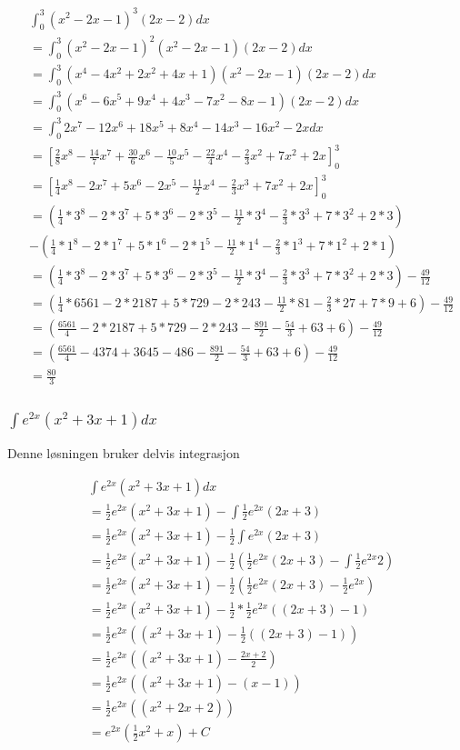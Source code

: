 \documentclass{article}
\begin{document}
\begin{align*}
    & \int_{0}^{3} (x^2-2x-1)^3(2x-2) dx \\
    &= \int_{0}^{3} (x^2-2x-1)^2(x^2-2x-1)(2x-2) dx \\
    &= \int_{0}^{3} (x^4-4x^2+2x^2+4x+1)(x^2-2x-1)(2x-2) dx \\
    &= \int_{0}^{3} (x^6-6x^5+9x^4+4x^3-7x^2-8x-1)(2x-2) dx \\
    &= \int_{0}^{3} 2x^7-12x^6+18x^5+8x^4-14x^3-16x^2-2x dx \\
    &= [\frac{2}{8}x^8-\frac{14}{7}x^7+\frac{30}{6}x^6-\frac{10}{5}x^5-\frac{22}{4}x^4-\frac{2}{3}x^2+7x^2+2x]^3_0 \\
    &= [\frac{1}{4}x^8-2x^7+5x^6-2x^5-\frac{11}{2}x^4-\frac{2}{3}x^3+7x^2+2x]^3_0 \\
    &= (\frac{1}{4}*3^8-2*3^7+5*3^6-2*3^5-\frac{11}{2}*3^4-\frac{2}{3}*3^3+7*3^2+2*3) \\
    &- (\frac{1}{4}*1^8-2*1^7+5*1^6-2*1^5-\frac{11}{2}*1^4-\frac{2}{3}*1^3+7*1^2+2*1) \\
    &= (\frac{1}{4}*3^8-2*3^7+5*3^6-2*3^5-\frac{11}{2}*3^4-\frac{2}{3}*3^3+7*3^2+2*3) - \frac{49}{12} \\
    &= (\frac{1}{4}*6561- 2*2187+5*729-2*243-\frac{11}{2}*81-\frac{2}{3}*27+7*9+6) - \frac{49}{12} \\
    &= (\frac{6561}{4}- 2*2187+5*729-2*243-\frac{891}{2}-\frac{54}{3}+63+6) - \frac{49}{12} \\
    &= (\frac{6561}{4}- 4374+3645-486-\frac{891}{2}-\frac{54}{3}+63+6) - \frac{49}{12} \\
    &= \frac{80}{3}
\end{align*}

\subsubsection{$\int e^{2x}(x^2+3x+1) dx$}

Denne løsningen bruker delvis integrasjon

\begin{align*}
    & \int e^{2x}(x^2+3x+1) dx \\ 
    &= \frac{1}{2} e^{2x} (x^2+3x+1) - \int \frac{1}{2} e^{2x} (2x+3) \\
    &= \frac{1}{2} e^{2x} (x^2+3x+1) - \frac{1}{2} \int e^{2x} (2x+3) \\
    &= \frac{1}{2} e^{2x} (x^2+3x+1) - \frac{1}{2} ( \frac{1}{2} e^{2x} (2x+3) - \int \frac{1}{2} e^{2x}2) \\
    &= \frac{1}{2} e^{2x} (x^2+3x+1) - \frac{1}{2} ( \frac{1}{2} e^{2x} (2x+3) - \frac{1}{2} e^{2x}) \\
    &= \frac{1}{2} e^{2x} (x^2+3x+1) - \frac{1}{2} * \frac{1}{2} e^{2x} ((2x+3) - 1) \\
    &= \frac{1}{2} e^{2x} ((x^2+3x+1) - \frac{1}{2} ((2x+3) - 1)) \\
    &= \frac{1}{2} e^{2x} ((x^2+3x+1) - \frac{2x+2}{2}) \\
    &= \frac{1}{2} e^{2x} ((x^2+3x+1) - (x-1)) \\
    &= \frac{1}{2} e^{2x} ((x^2+2x+2)) \\ 
    &= e^{2x} (\frac{1}{2} x^2 + x) + C
\end{align*}
\end{document}
